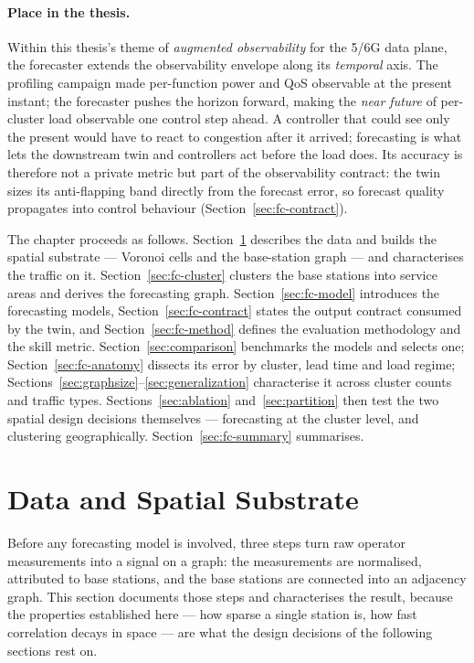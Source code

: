 \paragraph{Place in the thesis.} Within this thesis's theme of \emph{augmented
observability} for the 5/6G data plane, the forecaster extends the observability
envelope along its \emph{temporal} axis. The profiling campaign made per-function
power and QoS observable at the present instant; the forecaster pushes the
horizon forward, making the \emph{near future} of per-cluster load observable one
control step ahead. A controller that could see only the present would have to
react to congestion after it arrived; forecasting is what lets the downstream
twin and controllers act before the load does. Its accuracy is therefore not a
private metric but part of the observability contract: the twin sizes its
anti-flapping band directly from the forecast error, so forecast quality
propagates into control behaviour (Section~\ref{sec:fc-contract}).

The chapter proceeds as follows. Section~\ref{sec:fc-graph} describes the data and builds the spatial
substrate --- Voronoi cells and the base-station graph --- and characterises the traffic on it.
Section~\ref{sec:fc-cluster} clusters the base stations into service areas and derives the forecasting
graph. Section~\ref{sec:fc-model} introduces the forecasting models, Section~\ref{sec:fc-contract}
states the output contract consumed by the twin, and Section~\ref{sec:fc-method} defines the
evaluation methodology and the skill metric. Section~\ref{sec:comparison} benchmarks the models and
selects one; Section~\ref{sec:fc-anatomy} dissects its error by cluster, lead time and load regime;
Sections~\ref{sec:graphsize}--\ref{sec:generalization} characterise it across cluster counts and
traffic types. Sections~\ref{sec:ablation} and~\ref{sec:partition} then test the two spatial design
decisions themselves --- forecasting at the cluster level, and clustering geographically.
Section~\ref{sec:fc-summary} summarises.

\section{Data and Spatial Substrate}
\label{sec:fc-graph}

Before any forecasting model is involved, three steps turn raw operator measurements into a signal
on a graph: the measurements are normalised, attributed to base stations, and the base stations are
connected into an adjacency graph. This section documents those steps and characterises the result,
because the properties established here --- how sparse a single station is, how fast correlation
decays in space --- are what the design decisions of the following sections rest on.

